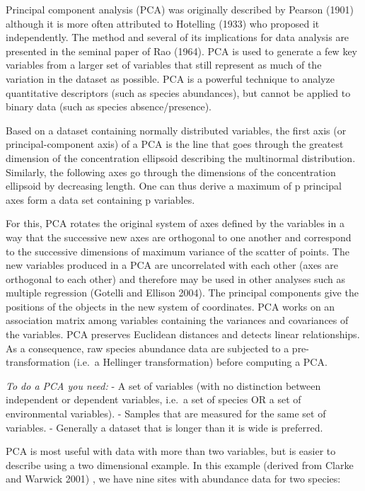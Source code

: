 \documentclass[
]{book}
\begin{document}
Principal component analysis (PCA) was originally described by Pearson
(1901) although it is more often attributed to Hotelling (1933) who
proposed it independently. The method and several of its implications
for data analysis are presented in the seminal paper of Rao (1964). PCA
is used to generate a few key variables from a larger set of variables
that still represent as much of the variation in the dataset as
possible. PCA is a powerful technique to analyze quantitative
descriptors (such as species abundances), but cannot be applied to
binary data (such as species absence/presence).

Based on a dataset containing normally distributed variables, the first
axis (or principal-component axis) of a PCA is the line that goes
through the greatest dimension of the concentration ellipsoid describing
the multinormal distribution. Similarly, the following axes go through
the dimensions of the concentration ellipsoid by decreasing length. One
can thus derive a maximum of p principal axes form a data set containing
p variables.

For this, PCA rotates the original system of axes defined by the
variables in a way that the successive new axes are orthogonal to one
another and correspond to the successive dimensions of maximum variance
of the scatter of points. The new variables produced in a PCA are
uncorrelated with each other (axes are orthogonal to each other) and
therefore may be used in other analyses such as multiple regression
(Gotelli and Ellison 2004). The principal components give the positions
of the objects in the new system of coordinates. PCA works on an
association matrix among variables containing the variances and
covariances of the variables. PCA preserves Euclidean distances and
detects linear relationships. As a consequence, raw species abundance
data are subjected to a pre-transformation (i.e.~a Hellinger
transformation) before computing a PCA.

\emph{To do a PCA you need:} - A set of variables (with no distinction
between independent or dependent variables, i.e.~a set of species OR a
set of environmental variables). - Samples that are measured for the
same set of variables. - Generally a dataset that is longer than it is
wide is preferred.

PCA is most useful with data with more than two variables, but is easier
to describe using a two dimensional example. In this example (derived
from Clarke and Warwick 2001) , we have nine sites with abundance data
for two species:
\end{document}

